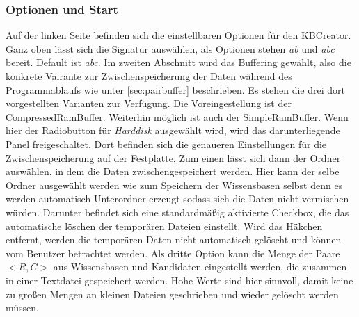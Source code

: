 \documentclass[12pt,a4paper]{article}
\begin{document}
\subsubsection{Optionen und Start}
Auf der linken Seite befinden sich die einstellbaren Optionen für den KBCreator. Ganz oben lässt sich die Signatur auswählen, als Optionen stehen \textit{ab} und \textit{abc} bereit. Default ist \textit{abc}. Im zweiten Abschnitt wird das Buffering gewählt, also die konkrete Vairante zur Zwischenspeicherung der Daten während des Programmablaufs wie unter \autoref{sec:pairbuffer} beschrieben. Es stehen die drei dort vorgestellten Varianten zur Verfügung. Die Voreingestellung ist der CompressedRamBuffer. Weiterhin möglich ist auch der SimpleRamBuffer. Wenn hier der Radiobutton für \textit{Harddisk} ausgewählt wird, wird das darunterliegende Panel freigeschaltet. Dort befinden sich die genaueren Einstellungen für die Zwischenspeicherung auf der Festplatte. Zum einen lässt sich dann der Ordner auswählen, in dem die Daten zwischengespeichert werden. Hier kann der selbe Ordner ausgewählt werden wie zum Speichern der Wissensbasen selbst denn es werden automatisch Unterordner erzeugt sodass sich die Daten nicht vermischen würden. Darunter befindet sich eine standardmäßig aktivierte Checkbox, die das automatische löschen der temporären Dateien einstellt. Wird das Häkchen entfernt, werden die temporären Daten nicht automatisch gelöscht und können vom Benutzer betrachtet werden. Als dritte Option kann die Menge der Paare $<R,C>$ aus Wissensbasen und Kandidaten eingestellt werden, die zusammen in einer Textdatei gespeichert werden. Hohe Werte sind hier sinnvoll, damit keine zu großen Mengen an kleinen Dateien geschrieben und wieder gelöscht werden müssen. \\
\end{document}
